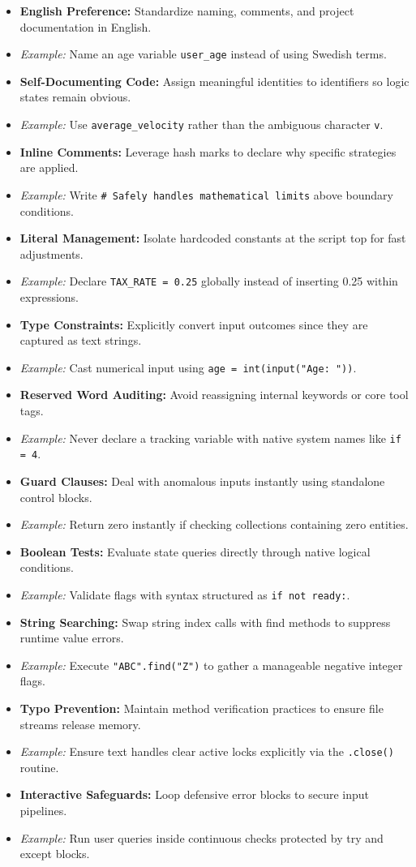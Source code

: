 \documentclass{article}
\begin{document}
\begin{itemize}
    \item \textbf{English Preference:} Standardize naming, comments, and project documentation in English.
    \item[] \textit{Example:} Name an age variable \texttt{user\_age} instead of using Swedish terms.
    \item \textbf{Self-Documenting Code:} Assign meaningful identities to identifiers so logic states remain obvious.
    \item[] \textit{Example:} Use \texttt{average\_velocity} rather than the ambiguous character \texttt{v}.
    \item \textbf{Inline Comments:} Leverage hash marks to declare why specific strategies are applied.
    \item[] \textit{Example:} Write \texttt{\# Safely handles mathematical limits} above boundary conditions.
    \item \textbf{Literal Management:} Isolate hardcoded constants at the script top for fast adjustments.
    \item[] \textit{Example:} Declare \texttt{TAX\_RATE = 0.25} globally instead of inserting 0.25 within expressions.
    \item \textbf{Type Constraints:} Explicitly convert input outcomes since they are captured as text strings.
    \item[] \textit{Example:} Cast numerical input using \texttt{age = int(input("Age: "))}.
    \item \textbf{Reserved Word Auditing:} Avoid reassigning internal keywords or core tool tags.
    \item[] \textit{Example:} Never declare a tracking variable with native system names like \texttt{if = 4}.
    \item \textbf{Guard Clauses:} Deal with anomalous inputs instantly using standalone control blocks.
    \item[] \textit{Example:} Return zero instantly if checking collections containing zero entities.
    \item \textbf{Boolean Tests:} Evaluate state queries directly through native logical conditions.
    \item[] \textit{Example:} Validate flags with syntax structured as \texttt{if not ready:}.
    \item \textbf{String Searching:} Swap string index calls with find methods to suppress runtime value errors.
    \item[] \textit{Example:} Execute \texttt{"ABC".find("Z")} to gather a manageable negative integer flags.
    \item \textbf{Typo Prevention:} Maintain method verification practices to ensure file streams release memory.
    \item[] \textit{Example:} Ensure text handles clear active locks explicitly via the \texttt{.close()} routine.
    \item \textbf{Interactive Safeguards:} Loop defensive error blocks to secure input pipelines.
    \item[] \textit{Example:} Run user queries inside continuous checks protected by try and except blocks.
\end{itemize}
\end{document}

